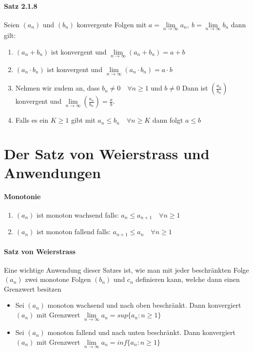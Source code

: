 \documentclass[8pt]{extreport}
\begin{document}
\paragraph{Satz 2.1.8} Seien $(a_{n})$ und $(b_{n})$ konvergente Folgen mit $a = \lim\limits_{n \to \infty} a_{n} , \ b = \lim\limits_{n \to \infty} b_{n}$ dann gilt:
\begin{enumerate}
\item $(a_{n} + b_{n})$ ist konvergent und  $\lim\limits_{n \to \infty} (a_{n} + b_{n}) = a + b$
\item $(a_{n} \cdot b_{n})$ ist konvergent und  $\lim\limits_{n \to \infty} (a_{n} \cdot b_{n}) = a \cdot b$
\item Nehmen wir zudem an, dass $b_{n} \neq 0 \quad \forall n \geq 1$ und $ b \neq 0$ Dann ist $(\frac{a_{n}}{b_{n}})$ konvergent und $\lim\limits_{n \to \infty} (\frac{a_{n}}{b_{n}}) = \frac{a}{b}$.
\item Falls es ein $K \geq 1$ gibt mit $a_{n} \leq b_{n} \quad \forall n\geq K$ dann folgt $a\leq b$
\end{enumerate}
\section{Der Satz von Weierstrass und Anwendungen}
\paragraph{Monotonie}
\begin{enumerate}
\item $(a_{n})$ ist monoton wachsend falls: $a_{n} \leq a_{n+1} \quad \forall n \geq 1$ 
\item $(a_{n})$ ist monoton fallend falls: $a_ {n+1} \leq a_{n} \quad \forall n \geq 1$
\end{enumerate}
\paragraph{Satz von Weierstrass} Eine wichtige Anwendung dieser Satzes ist, wie man mit jeder beschränkten Folge $(a_{n})$ zwei monotone Folgen $(b_{n})$ und $c_{n}$ definieren kann, welche dann einen Grenzwert besitzen
\begin{itemize}
\item Sei $(a_{n})$ monoton wachsend und nach oben beschränkt. Dann konvergiert $(a_{n})$ mit Grenzwert $\lim\limits_{n\to \infty} a_{n} = sup \{ a_{n} : n \geq 1\}$
\item Sei $(a_{n})$ monoton fallend und nach unten beschränkt. Dann konvergiert $(a_{n})$ mit Grenzwert $\lim\limits_{n\to \infty} a_{n} = inf \{ a_{n} : n \geq 1\}$
\end{itemize}
\end{document}
